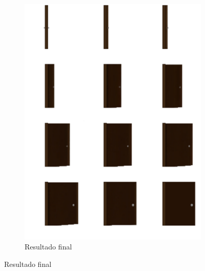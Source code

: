 \begin{figure}[htbp]
\begin{subfigure}{0.45\linewidth}
    \end{subfigure}
    \begin{subfigure}{0.45\linewidth}
        \centering
        \includegraphics[width=1\linewidth]{figs/pixelLab/final/side_door_pixel_vidu.png}
        \caption{\small Resultado final}
        \label{fig:pixelLabFinalPortaSideView2}
    \end{subfigure}


\end{figure}
